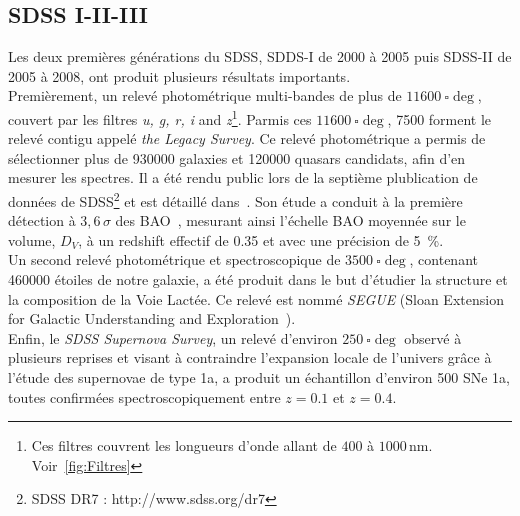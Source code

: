 \subsection{SDSS I-II-III}
Les deux premières générations du SDSS, SDDS-I de 2000 à 2005 puis SDSS-II de 2005 à 2008, ont produit plusieurs résultats importants.\\
Premièrement, un relevé photométrique multi-bandes de plus de $\SI{11600}{\square\deg}$, couvert par les filtres \emph{u, g, r, i} and \emph{z}\footnote{Ces filtres couvrent les longueurs d'onde allant de $400$ à $1000\,\mathrm{nm}$. Voir~\ref{fig:Filtres}}. Parmis ces $\SI{11600}{\square\deg}$, \num{7500} forment le relevé contigu appelé \emph{the Legacy Survey}. Ce relevé photométrique a permis de sélectionner plus de \num{930000} galaxies et \num{120000} quasars candidats, afin d'en mesurer les spectres. Il a été rendu public lors de la septième plublication de données de SDSS\footnote{SDSS DR7 : http://www.sdss.org/dr7} et est détaillé dans~\cite{Abazajian2008}. Son étude a conduit à la première détection à $3,6\,\sigma$ des BAO~\cite{Eisenstein2005}, mesurant ainsi l'échelle BAO moyennée sur le volume, $D_V$, à un redshift effectif de \num{0,35} et avec une précision de \SI{5}{\percent}. \\
Un second relevé photométrique et spectroscopique de $\SI{3500}{\square\deg}$, contenant \num{460000} étoiles de notre galaxie, a été produit dans le but d'étudier la structure et la composition de la Voie Lactée. Ce relevé est nommé \emph{SEGUE} (Sloan Extension for Galactic Understanding and Exploration~\cite{Collaboration2009}).\\
Enfin, le \emph{SDSS Supernova Survey}, un relevé d'environ $\SI{250}{\square\deg}$ observé à plusieurs reprises et visant à contraindre l'expansion locale de l'univers gr\^ace à l'étude des supernovae de type 1a, a produit un échantillon d'environ 500 SNe 1a, toutes confirmées spectroscopiquement entre $z=\num{0,1}$ et $z=\num{0,4}$.

